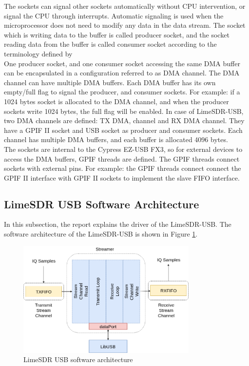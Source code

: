 The sockets can signal other sockets automatically without CPU intervention, or signal the CPU through interrupts.
Automatic signaling is used when the microprocessor does not need to modify any data in the data stream.
The socket which is writing data to the buffer is called producer socket, and the socket reading data from the buffer is called consumer socket according to the terminology defined by \cite{fx_getting_nodate}\\

One producer socket, and one consumer socket accessing the same \ac{DMA} buffer can be encapsulated in a configuration referred to as \ac{DMA} channel.
The \ac{DMA} channel can have multiple \ac{DMA} buffers.
Each DMA buffer has its own empty/full flag to signal the producer, and consumer sockets.
For example: if a 1024 bytes socket is allocated to the DMA channel, and when the producer sockets write 1024 bytes, the full flag will be enabled.
In case of LimeSDR-USB, two \ac{DMA} channels are defined: TX \ac{DMA}, channel and RX \ac{DMA} channel.
They have a GPIF II socket and USB socket as producer and consumer sockets.
Each channel has multiple \ac{DMA} buffers, and each buffer is allocated 4096 bytes.\\

The sockets are internal to the Cypress EZ-USB FX3, so for external devices to access the \ac{DMA} buffers, GPIF threads are defined.
The GPIF threads connect sockets with external pins.
For example: the GPIF threads connect connect the GPIF II interface with GPIF II sockets to implement the slave FIFO interface.\\


\subsection{LimeSDR USB Software Architecture}

In this subsection, the report explains the driver of the LimeSDR-USB.
The software architecture of the LimeSDR-USB is shown in Figure \ref{Lime_Software}.\\

\begin{figure}[h!]
\centering
\includegraphics[width=0.8\textwidth]{Figure/Lime_Software.png}
\caption{LimeSDR USB software architecture}
\label{Lime_Software}
\end{figure}

